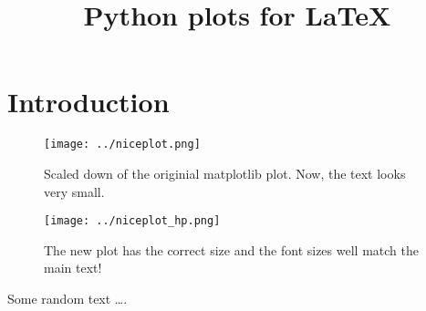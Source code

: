 \documentclass[twocolumn,a4paper]{scrartcl}
\title{Python plots for LaTeX}
\begin{document}
\maketitle
\section{Introduction}

\lipsum[1-1]

%
\begin{figure}[h]
  \centering
  \texttt{[image: ../niceplot.png]}
  \caption{Scaled down of the originial matplotlib plot.
    Now, the text looks very small.}
  \label{image1}
\end{figure}
%

\begin{figure}[h]
  \centering
  \texttt{[image: ../niceplot\_hp.png]}
  \caption{The new plot has the correct size and the
  font sizes well match the main text!}
  \label{image2}
\end{figure}

Some random text \dots.
\end{document}
